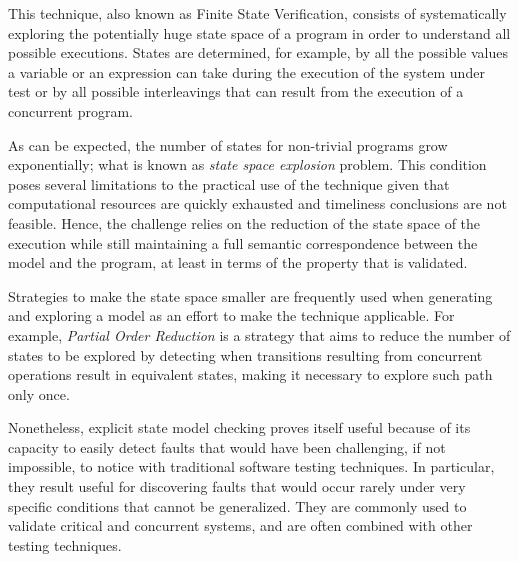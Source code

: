 
\label{subsec:explicit-state-model-checking}

This technique, also known as Finite State Verification, consists of systematically exploring the potentially huge state space of a program in order to understand all possible executions. States are determined, for example, by all the possible values a variable or an expression can take during the execution of the system under test or by all possible interleavings that can result from the execution of a concurrent program. 

As can be expected, the number of states for non-trivial programs grow exponentially; what is known as \textit{state space explosion} problem. This condition poses several limitations to the practical use of the technique given that computational resources are quickly exhausted and timeliness conclusions are not feasible. Hence, the challenge relies on the reduction of the state space of the execution while still maintaining a full semantic correspondence between the model and the program, at least in terms of the property that is validated.

Strategies to make the state space smaller are frequently used when generating and exploring a model as an effort to make the technique applicable. For example, \textit{Partial Order Reduction} is a strategy that aims to reduce the number of states to be explored by detecting when transitions resulting from concurrent operations result in equivalent states, making it necessary to explore such path only once. 

Nonetheless, explicit state model checking proves itself useful because of its capacity to easily detect faults that would have been challenging, if not impossible, to notice with traditional software testing techniques. In particular, they result useful for discovering faults that would occur rarely under very specific conditions that cannot be generalized. They are commonly used to validate critical and concurrent systems, and are often combined with other testing techniques.


\label{subsec:symbolic-execution}

